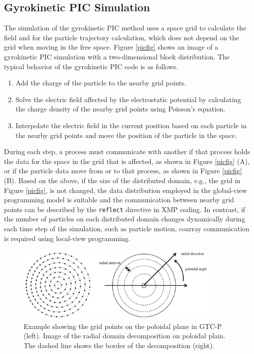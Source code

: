 \subsection{Gyrokinetic PIC Simulation}
The simulation of the gyrokinetic PIC method uses a space grid to calculate the field and for the particle trajectory calculation, which does not depend on the grid when moving in the free space. Figure \ref{picfig} shows an image of a gyrokinetic PIC simulation with a two-dimensional block distribution. The typical behavior of the gyrokinetic PIC code is as follows.

\begin{enumerate}
\item Add the charge of the particle to the nearby grid points.
\item Solve the electric field affected by the electrostatic potential by calculating the charge density of the nearby grid points using Poisson's equation.
\item Interpolate the electric field in the current position based on each particle in the nearby grid points and move the position of the particle in the space.
\end{enumerate}

During each step, a process must communicate with another if that process holds the data for the space in the grid that is affected, as shown in Figure \ref{picfig} (A), or if the particle data move from or to that process, as shown in Figure \ref{picfig} (B). Based on the above, if the size of the distributed domain, e.g., the grid in Figure \ref{picfig}, is not changed, the data distribution employed in the global-view programming model is suitable and the communication between nearby grid points can be described by the {\tt reflect} directive in XMP coding.
In contrast, if the number of particles on each distributed domain changes dynamically during each time step of the simulation, such as particle motion, coarray communication is required using local-view programming.

\begin{figure}[t]
\begin{center}
\includegraphics[width=10cm,bb=0 0 585 218]{./figure/poloidal.pdf}
\caption{Example showing the grid points on the poloidal plane in GTC-P\cite{POLOIDAL} (left). Image of the radial domain decomposition on poloidal plain. The dashed line shows the border of the decomposition (right).}
\label{poloidal}
\end{center}
\end{figure}


